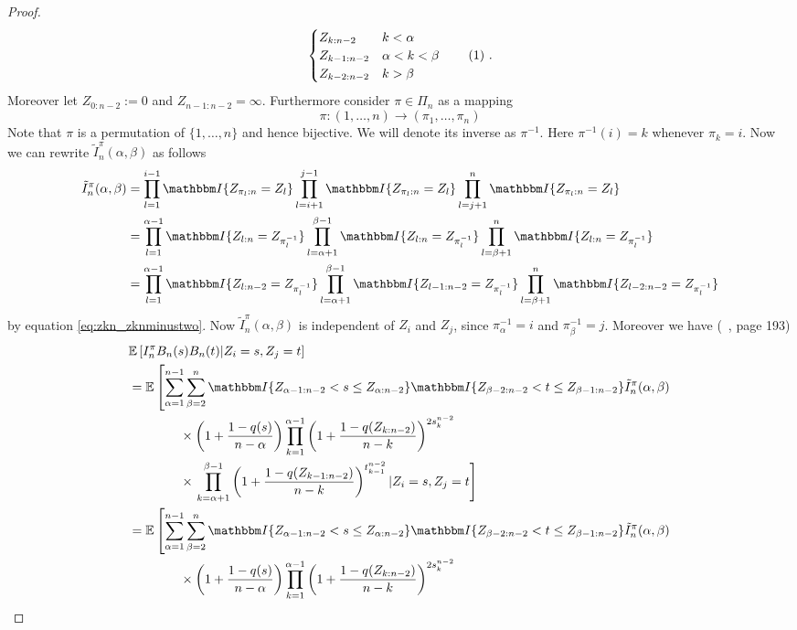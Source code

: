 \begin{lemma}
\begin{proof}
\[\begin{cases}
				Z_{k:n-2} & k < \alpha  \\
				Z_{k-1:n-2} & \alpha < k < \beta\\
				Z_{k-2:n-2} & k > \beta
			\end{cases}\numberthis\label{eq:zkn_zknminustwo}\mdot
		\]	
		Moreover let $Z_{0:n-2} := 0$ and $Z_{n-1:n-2} = \infty$. Furthermore consider $\pi\in\Pi_n$ as a mapping
		$$\pi: (1,\dots, n) \longrightarrow  (\pi_1,\dots, \pi_n)$$		
		Note that $\pi$ is a permutation of $\{1,\dots, n\}$ and hence bijective. We will denote its inverse as $\pi^{-1}$. Here $\pi^{-1}(i)=k$ whenever $\pi_k = i$. Now we can rewrite $\tilde{I}_n^\pi(\alpha,\beta)$ as follows
		\begin{align*}
			\tilde{I}_n^\pi(\alpha, \beta) &= \prod_{l=1}^{i-1} \I{Z_{\pi_l:n}=Z_l} \prod_{l=i + 1}^{j-1} \I{Z_{\pi_l:n}=Z_l} \prod_{l=j + 1}^{n}\I{Z_{\pi_l:n}=Z_l}\\
			&= \prod_{l=1}^{\alpha-1} \I{Z_{l:n}=Z_{\pi_l^{-1}}} \prod_{l=\alpha + 1}^{\beta-1} \I{Z_{l:n}=Z_{\pi_l^{-1}}} \prod_{l=\beta + 1}^{n} \I{Z_{l:n}=Z_{\pi_l^{-1}}}\\
			&= \prod_{l=1}^{\alpha-1} \I{Z_{l:n-2}=Z_{\pi_l^{-1}}} \prod_{l=\alpha + 1}^{\beta-1} \I{Z_{l-1:n-2}=Z_{\pi_l^{-1}}} \prod_{l=\beta + 1}^{n} \I{Z_{l-2:n-2}=Z_{\pi_l^{-1}}}
		\end{align*}
		by equation \eqref{eq:zkn_zknminustwo}. Now $\tilde{I}_n^\pi(\alpha, \beta)$ is independent of $Z_i$ and $Z_j$, since $\pi_{\alpha}^{-1} = i$ and $\pi_\beta^{-1}=j$.
		Moreover we have (\cf\ \cite{bose1999strong}, page 193)
		\begin{align*}
			&\E\left[I_n^\pi B_n(s)B_n(t)|Z_i=s, Z_j=t\right]\\
			&= \E\left[\sum_{\alpha=1}^{n-1} \sum_{\beta=2}^{n} \I{Z_{\alpha-1:n-2} < s \leq Z_{\alpha:n-2}} \I{Z_{\beta-2:n-2} < t \leq Z_{\beta-1:n-2}} \tilde{I}_n^\pi(\alpha, \beta)\right.\\ 
			&\qquad\qquad \times \left(1+\frac{1-q(s)}{n-\alpha}\right)\prod_{k=1}^{\alpha-1}\left(1+\frac{1-q(Z_{k:n-2})}{n-k}\right)^{2s_k^{n-2}} \\
			&\qquad\qquad \times \left. \prod_{k=\alpha+1}^{\beta-1}\left(1+\frac{1-q(Z_{k-1:n-2})}{n-k}\right)^{t_{k-1}^{n-2}} | Z_i=s, Z_j=t\right]\\
			&= \E\left[\sum_{\alpha=1}^{n-1} \sum_{\beta=2}^{n} \I{Z_{\alpha-1:n-2} < s \leq Z_{\alpha:n-2}} \I{Z_{\beta-2:n-2} < t \leq Z_{\beta-1:n-2}}\tilde{I}_n^\pi(\alpha, \beta)\right.\\ 
			&\qquad\qquad \times \left(1+\frac{1-q(s)}{n-\alpha}\right)\prod_{k=1}^{\alpha-1}\left(1+\frac{1-q(Z_{k:n-2})}{n-k}\right)^{2s_k^{n-2}} \\

\end{align*}
\end{proof}
\end{lemma}
